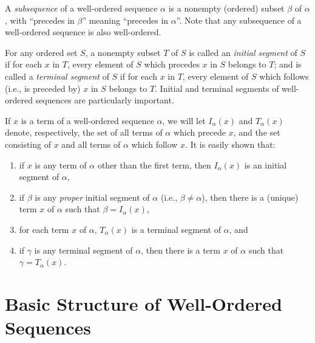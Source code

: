 \documentclass{article}
\begin{document}
A \emph{subsequence} of a well-ordered sequence $\alpha$ is a nonempty (ordered) subset $\beta$ of $\alpha$, with ``precedes in $\beta$'' meaning ``precedes in $\alpha$''. Note that any subsequence of a well-ordered sequence is also well-ordered.

For any ordered set $S$, a nonempty subset $T$ of $S$ is called an \emph{initial segment} of $S$ if for each $x$ in $T$, every element of $S$ which precedes $x$ in $S$ belongs to $T$; and is called a \emph{terminal segment} of $S$ if for each $x$ in $T$, every element of $S$ which follows (i.e., is preceded by) $x$ in $S$ belongs to $T$. Initial and terminal segments of well-ordered sequences are particularly important.

If $x$ is a term of a well-ordered sequence $\alpha$, we will let $I_\alpha(x)$ and $T_\alpha(x)$ denote, respectively, the set of all terms of $\alpha$ which precede $x$, and the set consisting of $x$ and all terms of $\alpha$ which follow $x$. It is easily shown that:
\begin{enumerate}[\vspace{1cm}(1)]
  \item if $x$ is any term of $\alpha$ other than the first term, then $I_\alpha(x)$ is an initial segment of $\alpha$,
  \item if $\beta$ is any \emph{proper} initial segment of $\alpha$ (i.e., $\beta \neq \alpha$), then there is a (unique) term $x$ of $\alpha$ such that $\beta = I_\alpha(x)$,
  \item for each term $x$ of $\alpha$, $T_\alpha(x)$ is a terminal segment of $\alpha$, and 
  \item if $\gamma$ is any terminal segment of $\alpha$, then there is a term $x$ of $\alpha$ such that $\gamma = T_\alpha(x)$.
\end{enumerate}


\section{Basic Structure of Well-Ordered Sequences}
\end{document}
